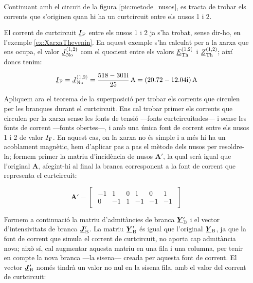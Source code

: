 \begin{exemple}\label{ex:CurtcircuitXarxaComplexa}
	\addcontentsxms{\CurtcircuitXarxaComplexa}	
	Continuant amb el circuit de la figura \vref{pic:metode_nusos}, es
	tracta de trobar els corrents que s'originen quan hi ha un curtcircuit entre els nusos 1 i 2.
	
	El corrent de curtcircuit $\cmplx{I}\ped{F}$ entre els nusos 1 i 2 ja s'ha trobat, sense dir-ho, en l'exemple \ref{ex:XarxaThevenin}. En aquest exemple s'ha calculat per a la xarxa que ens ocupa, el valor $\cmplx{J}\ped{No}^{(1,2)}$ com el quocient entre els valors $\cmplx{E}\ped{Th}^{(1,2)}$ i $\cmplx{Z}\ped{Th}^{(1,2)}$;  així doncs tenim:
	
	\[
		\cmplx{I}\ped{F} = \cmplx{J}\ped{No}^{(1,2)} =  \frac{\complexnum{518-j301}}{25}\,\unit{A} = \complexqty{20.72-j12.04}{A}
	\]
	
	Apliquem ara el teorema de la superposició per trobar els corrents que circulen per les branques durant el curtcircuit. Ens cal trobar primer els corrents que circulen per la xarxa sense les fonts de tensió ---fonts curtcircuitades--- i sense les fonts de corrent ---fonts  obertes---, i amb una única font de corrent entre els nusos 1 i 2 de valor  $I_\mathrm{F}$. En aquest cas, on la xarxa no és simple i a més hi ha un acoblament magnètic, hem d'aplicar pas a pas el mètode dels nusos per resoldre-la; formem primer la matriu d'incidència  de nusos $\boldsymbol{A}'$, la qual serà igual que l'original $\boldsymbol{A}$, afegint-hi al final la branca corresponent a la font de corrent que representa el curtcircuit:

	\[
		\boldsymbol{A}' = 
		\begin{bmatrix}\begin{array}{rrrrrr} 
				-1 & 1  & 0 &  1 & 0 & 1\\  0 & -1 & 1 & -1 & -1 & -1
		\end{array}\end{bmatrix}
	\]	
	
	Formem a continuació la matriu d'admitàncies de branca $\mcmplx{Y}'\ped{B}$ i el vector d'intensivitats de branca $\mcmplx{J}'\ped{B}$. La matriu $\mcmplx{Y}'\ped{B}$ és igual que l'original $\mcmplx{Y}\ped{B}$, ja que la font de corrent que simula el corrent de curtcircuit, no aporta cap admitància nova; això sí, cal augmentar aquesta matriu en una fila i una columna, per tenir en compte la nova branca ---la sisena--- creada per aquesta font de corrent. El vector $\mcmplx{J}'\ped{B}$ només tindrà un valor no nul en la sisena fila, amb el valor del corrent de curtcircuit:
	

\end{exemple}
